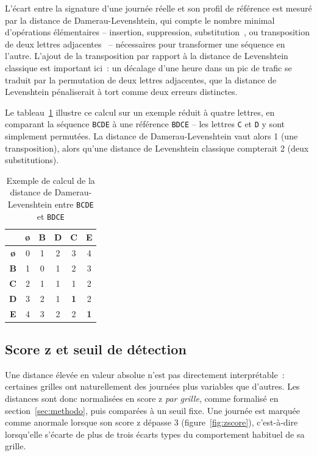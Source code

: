 L'écart entre la signature d'une journée réelle et son profil de
référence est mesuré par la distance de Damerau-Levenshtein, qui
compte le nombre minimal d'opérations élémentaires -- insertion,
suppression, substitution~\parencite{levenshtein1966binary}, ou
transposition de deux lettres adjacentes~\parencite{damerau1964technique}
-- nécessaires pour transformer une séquence en l'autre. L'ajout de la
transposition par rapport à la distance de Levenshtein classique est
important ici~: un décalage d'une heure dans un pic de trafic se
traduit par la permutation de deux lettres adjacentes, que la
distance de Levenshtein pénaliserait à tort comme deux erreurs
distinctes.

Le tableau~\ref{tab:dl-example} illustre ce calcul sur un exemple
réduit à quatre lettres, en comparant la séquence \texttt{BCDE} à une
référence \texttt{BDCE} -- les lettres \texttt{C} et \texttt{D} y sont
simplement permutées. La distance de Damerau-Levenshtein vaut alors 1
(une transposition), alors qu'une distance de Levenshtein classique
compterait 2 (deux substitutions).

\begin{table}[htbp]
  \centering
  \caption{Exemple de calcul de la distance de Damerau-Levenshtein entre \texttt{BCDE} et \texttt{BDCE}}
  \label{tab:dl-example}
  \begin{tabular}{c|ccccc}
    \toprule
     & \textbf{\o} & \textbf{B} & \textbf{D} & \textbf{C} & \textbf{E} \\
    \midrule
    \textbf{\o} & 0 & 1 & 2 & 3 & 4 \\
    \textbf{B}  & 1 & 0 & 1 & 2 & 3 \\
    \textbf{C}  & 2 & 1 & 1 & 1 & 2 \\
    \textbf{D}  & 3 & 2 & 1 & \textbf{1} & 2 \\
    \textbf{E}  & 4 & 3 & 2 & 2 & \textbf{1} \\
    \bottomrule
  \end{tabular}
\end{table}

\subsection{Score z et seuil de détection}

Une distance élevée en valeur absolue n'est pas directement
interprétable~: certaines grilles ont naturellement des journées plus
variables que d'autres. Les distances sont donc normalisées en score
z \emph{par grille}, comme formalisé en section~\ref{sec:methodo},
puis comparées à un seuil fixe. Une journée est marquée comme
anormale lorsque son score z dépasse 3 (figure~\ref{fig:zscore}),
c'est-à-dire lorsqu'elle s'écarte de plus de trois écarts types du
comportement habituel de sa grille.

